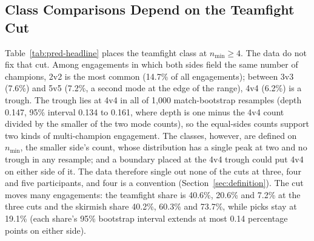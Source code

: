 \subsection{Class Comparisons Depend on the Teamfight Cut}\label{sec:pred-cut}

Table~\ref{tab:pred-headline} places the teamfight class at $n_{\min} \ge 4$. The data do not fix that
cut. Among engagements in which both sides field the same number of champions, 2v2 is the most common
(14.7\% of all engagements); between 3v3 (7.6\%) and 5v5 (7.2\%, a second mode at the edge of the range),
4v4 (6.2\%) is a trough. The trough lies at 4v4 in all of 1,000 match-bootstrap resamples (depth 0.147,
95\% interval 0.134 to 0.161, where depth is one minus the 4v4 count divided by the smaller of the two mode
counts), so the equal-sides counts support two kinds of multi-champion engagement. The classes, however,
are defined on $n_{\min}$, the smaller side's count, whose distribution has a single peak at two and no
trough in any resample; and a boundary placed at the 4v4 trough could put 4v4 on either side of it. The
data therefore single out none of the cuts at three, four and five participants, and four is a convention
(Section~\ref{sec:definition}). The cut moves many engagements: the teamfight share is 40.6\%, 20.6\% and
7.2\% at the three cuts and the skirmish share 40.2\%, 60.3\% and 73.7\%, while picks stay at 19.1\%
(each share's 95\% bootstrap interval extends at most 0.14 percentage points on either side).

